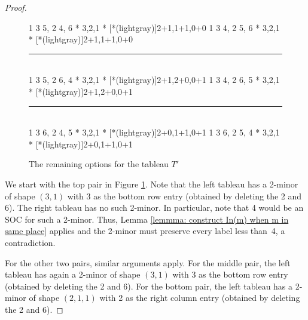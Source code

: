 \documentclass[12pt]{amsart}
\theoremstyle{definition}
\theoremstyle{remark}
\numberwithin{equation}{section}
\numberwithin{figure}{section}
\begin{document}
\begin{proof}
    \begin{figure}[H]
		\centering
      \ytableaushort
        {1 3 5, 2 4,
        6}
        * {3,2,1}
        * [*(lightgray)]{2+1,1+1,0+0}
		\;\;\;\;\;\;\;
    \ytableaushort
        {1 3 4, 2 5,
        6}
        * {3,2,1}
        * [*(lightgray)]{2+1,1+1,0+0}
  \\[.5cm]
  \par\noindent\rule{\textwidth}{0.4pt}
  \\[.5cm]
    \ytableaushort
        {1 3 5, 2 6,
        4}
        * {3,2,1}
        * [*(lightgray)]{2+1,2+0,0+1}
		\;\;\;\;\;\;\;
    \ytableaushort
        {1 3 4, 2 6,
        5}
        * {3,2,1}
        * [*(lightgray)]{2+1,2+0,0+1}
  \\[.5cm]
  \par\noindent\rule{\textwidth}{0.4pt}
  \\[.5cm]
      \ytableaushort
        {1 3 6, 2 4,
        5}
        * {3,2,1}
        * [*(lightgray)]{2+0,1+1,0+1}
		\;\;\;\;\;\;\;
      \ytableaushort
        {1 3 6, 2 5,
        4}
        * {3,2,1}
        * [*(lightgray)]{2+0,1+1,0+1}
		\caption{The remaining options for the tableau $T'$}
		\label{figure: (3,2,1) part 2}
	\end{figure}

    We start with the top pair in Figure \ref{figure: (3,2,1) part 2}. Note that the left tableau has a 2-minor of shape $(3,1)$ with 3 as the bottom row entry (obtained by deleting the 2 and 6). The right tableau has no such 2-minor. In particular, note that 4 would be an SOC for such a 2-minor. Thus, Lemma \ref{lemmma: construct In(m) when m in same place} applies and the 2-minor must preserve every label less than~4, a contradiction.

    For the other two pairs, similar arguments apply. For the middle pair, the left
    tableau has again a 2-minor of shape $(3,1)$ with 3 as the bottom row entry (obtained by deleting the 2 and 6). For the bottom pair, the left tableau has a 2-minor of shape $(2,1,1)$ with 2 as the right column entry (obtained by deleting the 2 and 6).
 \end{proof}
\end{document}
